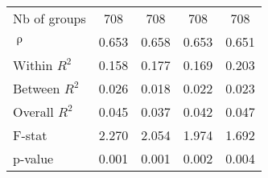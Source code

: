 \begin{table}[htbp]
{\begin{tabular}{lcccc}
    Nb of groups & 708   & 708   & 708   & 708 \\
    $\uprho$ & 0.653 & 0.658 & 0.653 & 0.651 \\
    Within $R^2$ & 0.158 & 0.177 & 0.169 & 0.203 \\
    Between $R^2$ & 0.026 & 0.018 & 0.022 & 0.023 \\
    Overall $R^2$ & 0.045 & 0.037 & 0.042 & 0.047 \\
    F-stat & 2.270 & 2.054 & 1.974 & 1.692 \\
    p-value & 0.001 & 0.001 & 0.002 & 0.004 \\
    \bottomrule
    \end{tabular}%
    }
  \label{tab:addlabel}%
\end{table}%
